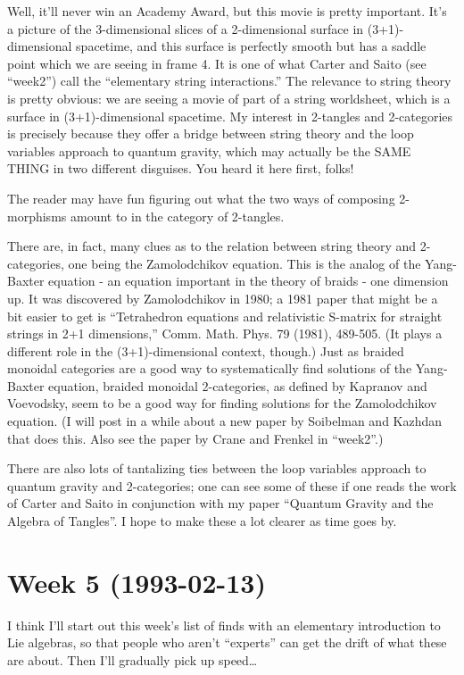 \documentclass{article}
\begin{document}
Well, it'll never win an Academy Award, but this movie is pretty
important. It's a picture of the 3-dimensional slices of a 2-dimensional
surface in (3+1)-dimensional spacetime, and this surface is perfectly
smooth but has a saddle point which we are seeing in frame 4. It is one
of what Carter and Saito (see ``week2'') call the ``elementary string
interactions.'' The relevance to string theory is pretty obvious: we are
seeing a movie of part of a string worldsheet, which is a surface in
(3+1)-dimensional spacetime. My interest in 2-tangles and 2-categories
is precisely because they offer a bridge between string theory and the
loop variables approach to quantum gravity, which may actually be the
SAME THING in two different disguises. You heard it here first, folks!

The reader may have fun figuring out what the two ways of composing
2-morphisms amount to in the category of 2-tangles.

There are, in fact, many clues as to the relation between string theory
and 2-categories, one being the Zamolodchikov equation. This is the
analog of the Yang-Baxter equation - an equation important in the theory
of braids - one dimension up. It was discovered by Zamolodchikov in
1980; a 1981 paper that might be a bit easier to get is ``Tetrahedron
equations and relativistic S-matrix for straight strings in 2+1
dimensions,'' Comm. Math. Phys. 79 (1981), 489-505. (It plays a
different role in the (3+1)-dimensional context, though.) Just as
braided monoidal categories are a good way to systematically find
solutions of the Yang-Baxter equation, braided monoidal 2-categories, as
defined by Kapranov and Voevodsky, seem to be a good way for finding
solutions for the Zamolodchikov equation. (I will post in a while about
a new paper by Soibelman and Kazhdan that does this. Also see the paper
by Crane and Frenkel in ``week2''.)

There are also lots of tantalizing ties between the loop variables
approach to quantum gravity and 2-categories; one can see some of these
if one reads the work of Carter and Saito in conjunction with my paper
``Quantum Gravity and the Algebra of Tangles''. I hope to make these a
lot clearer as time goes by.
\hypertarget{week-5-1993-02-13}{%
\section{Week 5 (1993-02-13)}\label{week-5-1993-02-13}}

I think I'll start out this week's list of finds with an elementary
introduction to Lie algebras, so that people who aren't ``experts'' can
get the drift of what these are about. Then I'll gradually pick up
speed\ldots{}
\end{document}
